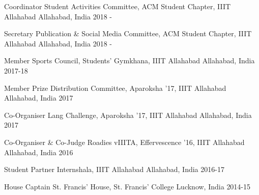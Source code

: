 

\begin{cvhonors}

  \cvhonor
    {Coordinator} %
    {Student Activities Committee, ACM Student Chapter, IIIT Allahabad} %
    {Allahabad, India} %
    {2018 -} %
    
  \cvhonor
    {Secretary} %
    {Publication \& Social Media Committee, ACM Student Chapter, IIIT Allahabad} %
    {Allahabad, India} %
    {2018 -} %
    
  \cvhonor
    {Member} %
    {Sports Council, Students' Gymkhana, IIIT Allahabad} %
    {Allahabad, India} %
    {2017-18} %

  \cvhonor
    {Member} %
    {Prize Distribution Committee, Aparoksha '17, IIIT Allahabad} %
    {Allahabad, India} %
    {2017} %

  \cvhonor
    {Co-Organiser} %
    {Lang Challenge, Aparoksha '17, IIIT Allahabad} %
    {Allahabad, India} %
    {2017} %

  \cvhonor
    {Co-Organiser \& Co-Judge} %
    {Roadies vIIITA, Effervescence '16, IIIT Allahabad} %
    {Allahabad, India} %
    {2016} %

  \cvhonor
    {Student Partner} %
    {Internshala, IIIT Allahabad} %
    {Allahabad, India} %
    {2016-17} %

  \cvhonor
    {House Captain} %
    {St. Francis' House, St. Francis' College} %
    {Lucknow, India} %
    {2014-15} %


\end{cvhonors}